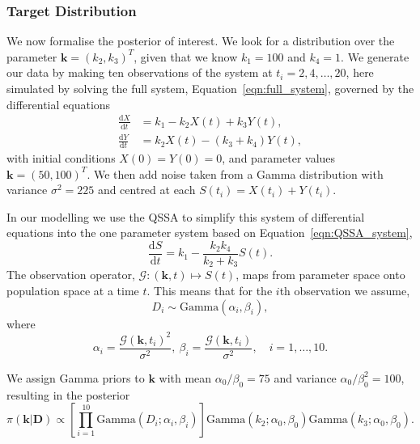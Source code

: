 \documentclass[final]{siamltex}
\begin{document}
\subsubsection{Target Distribution}

We now formalise the posterior of interest. We look for a distribution over the parameter $\mathbf{k} = (k_2, k_3)^T$, given that we know $k_1 = 100$ and $k_4=1$. We generate our data by making ten observations of the system at $t_i = 2, 4, \dots, 20$, here simulated by solving the full system, Equation~\ref{eqn:full_system}, governed by the differential equations
\begin{align*}
	\frac{\text{d}X}{\text{d}t} &= k_1 - k_2X(t)+k_3Y(t), \\
	\frac{\text{d}Y}{\text{d}t} &= k_2X(t) - (k_3+k_4)Y(t),
\end{align*}
with initial conditions $X(0)=Y(0) = 0$, and parameter values $\mathbf{k} = (50, 100)^T$. We then add noise taken from a Gamma distribution with variance $\sigma^2 = 225$ and centred at each $S(t_i)=X(t_i)+Y(t_i)$.

In our modelling we use the QSSA to simplify this system of differential equations into the one parameter system based on Equation~\ref{eqn:QSSA_system},
\[
	\frac{\text{d}S}{\text{d}t} = k_1 - \frac{k_2k_4}{k_2+k_3}S(t).
\]
The observation operator, $\mathcal{G}: (\mathbf{k},t) \mapsto S(t)$, maps from parameter space onto population space at a time $t$. This means that for the $i$th observation we assume,
\[
	 D_i \sim \text{Gamma}(\alpha_i, \beta_i),
\]
where
\[
	 \alpha_i = \frac{\mathcal{G}(\mathbf{k}, t_i)^2}{\sigma^2},\  \beta_i = \frac{\mathcal{G}(\mathbf{k}, t_i)}{\sigma^2}, \quad i = 1, \dots, 10.
\]

We assign Gamma priors to $\mathbf{k}$ with mean $\alpha_0/\beta_0 = 75$ and variance $\alpha_0/\beta_0^2 = 100$, resulting in the posterior
\[
	\pi(\mathbf{k}|\mathbf{D}) \propto \left[\prod\limits_{i=1}^{10} \text{Gamma}(D_i; \alpha_i, \beta_i)\right]\text{Gamma}(k_2; \alpha_0, \beta_0)\text{Gamma}(k_3; \alpha_0, \beta_0).
\]
\end{document}

